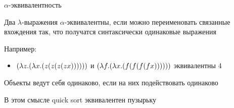 \begin{frame}{$\alpha$-эквивалентность}
\begin{definition}
Два $\lambda$-выражения $\alpha$-эквивалентны, если можно переименовать связанные вхождения так, что получатся синтаксически одинаковые выражения
\end{definition}
Например:
\begin{itemize}
\item $(\lambda z . (\lambda x . (z (z (z (z x))))))$ и $(\lambda f . (\lambda x . (f (f (f (f x))))))$ эквивалентны 4
\end{itemize}
\begin{definition}
Объекты ведут себя одинаково, если на них подействовать одинаково
\end{definition}
В этом смысле quick sort эквивалентен пузырьку
\end{frame}

